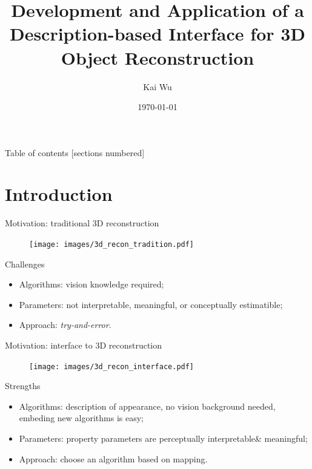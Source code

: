 \documentclass[10pt]{beamer}
\title[Interface of 3D Reconstruction]{Development and Application of a Description-based Interface for 3D Object Reconstruction} %
\author{Kai Wu}
\institute[UBC]
{
University of British Columbia \\ %
\medskip
kaywu@ece.ubc.ca \\ %
}
\date{\today}
\begin{document}
\begin{frame}
\maketitle
\end{frame}

\begin{frame}{Table of contents}
  [sections numbered]
  \tableofcontents[hideallsubsections]
\end{frame}


\section{Introduction}
\begin{frame}{Motivation: traditional 3D reconstruction}

\begin{figure}
\centering
\texttt{[image: images/3d\_recon\_tradition.pdf]}
\end{figure}

\begin{alertblock}{Challenges}
  \begin{itemize}
    \item Algorithms: vision knowledge required;
    \item Parameters: not interpretable, meaningful, or conceptually estimatible;
    \item Approach: \textit{try-and-error}.
  \end{itemize}
\end{alertblock}

\end{frame}

\begin{frame}{Motivation: interface to 3D reconstruction}

\begin{figure}
\centering
\texttt{[image: images/3d\_recon\_interface.pdf]}
\end{figure}

\begin{exampleblock}{Strengths}
  \begin{itemize}
    \item Algorithms: description of appearance, no vision background needed, embeding new algorithms is easy;
    \item Parameters: property parameters are perceptually interpretable\& meaningful;
    \item Approach: choose an algorithm based on mapping.
  \end{itemize}
\end{exampleblock}

\end{frame}
\end{document}
